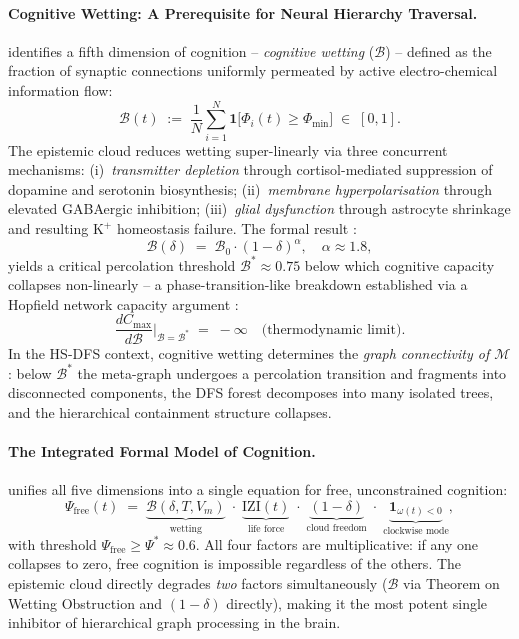 ﻿\documentclass[12pt,a4paper]{article}
\theoremstyle{plain}
\theoremstyle{definition}
\theoremstyle{remark}
\begin{document}
	\paragraph{Cognitive Wetting: A Prerequisite for Neural Hierarchy
		Traversal.}
	\cite{epp2026brain} identifies a fifth dimension of cognition --
	\emph{cognitive wetting} ($\mathcal{B}$) -- defined as the fraction of
	synaptic connections uniformly permeated by active electro-chemical
	information flow:
	\[
	\mathcal{B}(t) \;:=\; \frac{1}{N}\sum_{i=1}^{N}
	\mathbf{1}\bigl[\Phi_i(t) \geq \Phi_{\min}\bigr] \;\in\; [0,1].
	\]
	The epistemic cloud reduces wetting super-linearly \cite{epp2026brain}
	via three concurrent mechanisms: (i)~\emph{transmitter depletion}
	through cortisol-mediated suppression of dopamine and serotonin
	biosynthesis; (ii)~\emph{membrane hyperpolarisation} through elevated
	GABAergic inhibition; (iii)~\emph{glial dysfunction} through astrocyte
	shrinkage and resulting $\mathrm{K}^+$ homeostasis failure.  The formal
	result \cite{epp2026brain}:
	\[
	\mathcal{B}(\delta) \;=\; \mathcal{B}_0 \cdot (1-\delta)^\alpha,
	\quad \alpha \approx 1.8,
	\]
	yields a critical percolation threshold $\mathcal{B}^* \approx 0.75$
	below which cognitive capacity collapses non-linearly -- a
	phase-transition-like breakdown established via a Hopfield network
	capacity argument \cite{hopfield1982,epp2026brain}:
	\[
	\frac{dC_{\max}}{d\mathcal{B}}\bigg|_{\mathcal{B}=\mathcal{B}^*}
	\;=\; -\infty \quad \text{(thermodynamic limit)}.
	\]
	In the HS-DFS context, cognitive wetting determines the \emph{graph
		connectivity of $\mathcal{M}$}: below $\mathcal{B}^*$ the meta-graph
	undergoes a percolation transition and fragments into disconnected
	components, the DFS forest decomposes into many isolated trees, and
	the hierarchical containment structure collapses.
	
	\paragraph{The Integrated Formal Model of Cognition.}
	\cite{epp2026brain} unifies all five dimensions into a single equation
	for free, unconstrained cognition:
	\[
	\Psi_{\mathrm{free}}(t) \;=\;
	\underbrace{\mathcal{B}(\delta, T, V_m)}_{\text{wetting}}
	\;\cdot\;
	\underbrace{\mathrm{IZI}(t)}_{\text{life force}}
	\;\cdot\;
	\underbrace{(1-\delta)}_{\text{cloud freedom}}
	\;\cdot\;
	\underbrace{\mathbf{1}_{\omega(t)<0}}_{\text{clockwise mode}},
	\]
	with threshold $\Psi_{\mathrm{free}} \geq \Psi^* \approx 0.6$.  All
	four factors are multiplicative: if any one collapses to zero, free
	cognition is impossible regardless of the others.  The epistemic cloud
	directly degrades \emph{two} factors simultaneously ($\mathcal{B}$ via
	Theorem on Wetting Obstruction and $(1-\delta)$ directly), making it the
	most potent single inhibitor of hierarchical graph processing in the brain.
\end{document}
